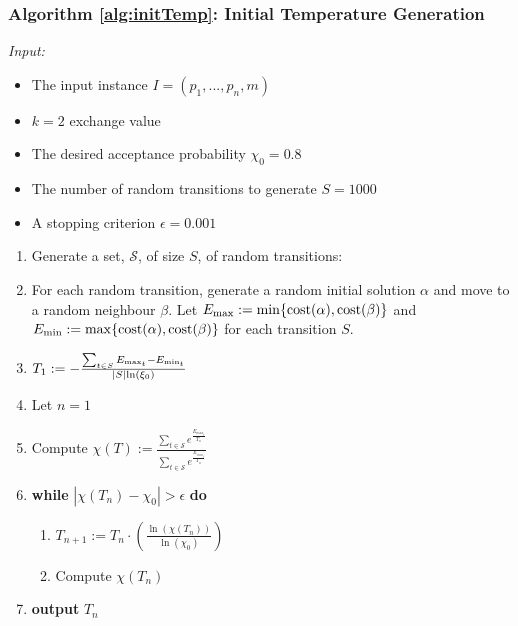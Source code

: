 \documentclass[12pt,a4paper,reqno]{article}
\begin{document}
\subsubsection*{Algorithm \ref{alg:initTemp}: Initial Temperature Generation}
\label{alg:initTemp}
\emph{Input:}
\begin{itemize}
  \item The input instance $I=(p_1,...,p_n,m)$
  \item $k=2$ exchange value
  \item The desired acceptance probability $\chi_0 = 0.8$
  \item The number of random transitions to generate $S = 1000$
  \item A stopping criterion $\epsilon = 0.001$
\end{itemize}
\begin{enumerate}
  \item Generate a set, $\mathcal{S}$, of size $S$, of random transitions:
  \item[] For each random transition, generate a random initial solution $\alpha$ and move to a random neighbour $\beta$. Let $E_\textnormal{max} := \min\{\textnormal{cost}(\alpha),\textnormal{cost}(\beta)\}$ and $E_{\textnormal{min}} := \max\{\textnormal{cost}(\alpha),\textnormal{cost}(\beta)\}$ for each transition $S$.
  \item $T_1:= - \frac{\sum_{t \in S} E_{\textnormal{max}_t} - E_{\textnormal{min}_t}}{|S| \textnormal{ln}(\xi_0)}$
  \item[] Let $n=1$
  \item[] Compute $\chi(T):=\frac{\displaystyle\sum\limits_{t\in \mathcal{S}} e^\frac{E_{{max}_{t}}}{T_n}}{\displaystyle\sum\limits_{t\in \mathcal{S}} e^\frac{E_{{min}_{t}}}{T_n}}$
  \item \textbf{while} $|\chi(T_n)-\chi_0|>\epsilon$ \textbf{do}
  \begin{enumerate}
    \item $T_{n+1} := T_{n} \cdot(\frac{\ln(\chi(T_n))}{\ln(\chi_0)})$%
    \item Compute $\chi(T_n)$
  \end{enumerate}
  \item \textbf{output} $T_n$
\end{enumerate}
\end{document}
